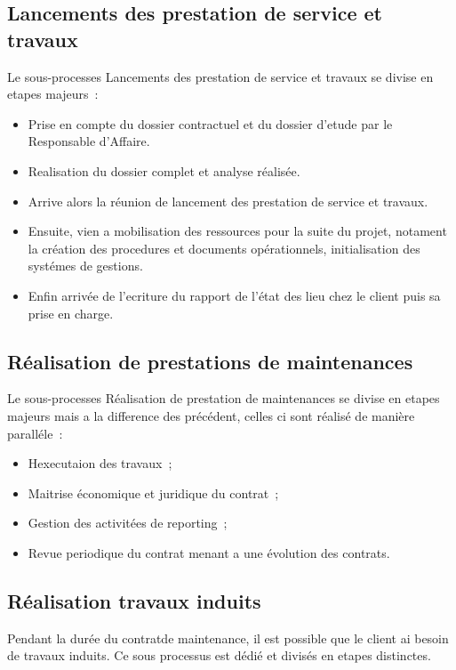 \subsection{Lancements des prestation de service et travaux}

Le sous-processes Lancements des prestation de service et travaux se divise en etapes majeurs~:

\begin{itemize}
    \item Prise en compte du dossier contractuel et du dossier d'etude par le Responsable d'Affaire.
    \item Realisation du dossier complet et analyse r\'ealis\'ee.
    \item Arrive alors la r\'eunion  de lancement des prestation de service et travaux.
    \item Ensuite, vien a mobilisation des ressources pour la suite du projet, notament la cr\'eation
    des procedures et documents op\'erationnels, initialisation des syst\'emes de gestions.
    \item Enfin arriv\'ee de l'ecriture du rapport de l'\'etat des lieu chez le client puis sa prise en charge.
\end{itemize}

\subsection{R\'ealisation de prestations de maintenances}

Le sous-processes R\'ealisation de prestation de maintenances se divise en etapes majeurs mais a la difference
des pr\'ec\'edent, celles ci sont r\'ealis\'e de mani\`ere parall\'ele~:

\begin{itemize}
    \item Hexecutaion des travaux~;
    \item Maitrise \'economique et juridique du contrat~;
    \item Gestion des activit\'ees de reporting~;
    \item Revue periodique du contrat menant a une \'evolution des contrats.
\end{itemize}

\subsection{R\'ealisation travaux induits}

Pendant la dur\'ee du contratde maintenance, il est possible que le client ai besoin de travaux induits.
Ce sous processus est d\'edi\'e et divis\'es en etapes distinctes.

